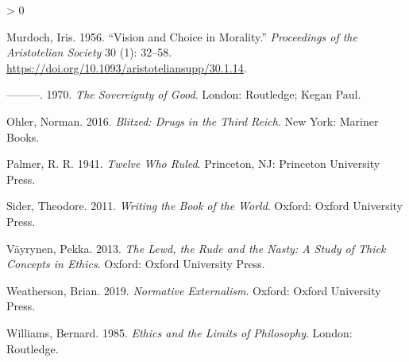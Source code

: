 \documentclass[
]{article}
\newlength{\cslhangindent}
\newenvironment{CSLReferences}[2] %
 {%
  \setlength{\parindent}{0pt}
  \ifodd #1 \everypar{\setlength{\hangindent}{\cslhangindent}}\ignorespaces\fi
  \ifnum #2 > 0
  \setlength{\parskip}{#2\baselineskip}
  \fi
 }%
 {}
\begin{document}
\begin{CSLReferences}{1}{0}
\leavevmode\hypertarget{ref-Murdoch1956}{}%
Murdoch, Iris. 1956. {``Vision and Choice in Morality.''}
\emph{Proceedings of the Aristotelian Society} 30 (1): 32--58.
\url{https://doi.org/10.1093/aristoteliansupp/30.1.14}.

\leavevmode\hypertarget{ref-Murdoch1970}{}%
---------. 1970. \emph{The Sovereignty of Good}. London: Routledge;
Kegan Paul.

\leavevmode\hypertarget{ref-Ohler2016}{}%
Ohler, Norman. 2016. \emph{Blitzed: Drugs in the Third Reich}. New York:
Mariner Books.

\leavevmode\hypertarget{ref-Palmer1941}{}%
Palmer, R. R. 1941. \emph{Twelve Who Ruled}. Princeton, NJ: Princeton
University Press.

\leavevmode\hypertarget{ref-Sider2012}{}%
Sider, Theodore. 2011. \emph{Writing the Book of the World}. Oxford:
Oxford University Press.

\leavevmode\hypertarget{ref-Vayrynen2013}{}%
Väyrynen, Pekka. 2013. \emph{The Lewd, the Rude and the Nasty: A Study
of Thick Concepts in Ethics}. Oxford: Oxford University Press.

\leavevmode\hypertarget{ref-Weatherson2019}{}%
Weatherson, Brian. 2019. \emph{Normative Externalism}. Oxford: Oxford
University Press.

\leavevmode\hypertarget{ref-Williams1985}{}%
Williams, Bernard. 1985. \emph{Ethics and the Limits of Philosophy}.
London: Routledge.

\end{CSLReferences}
\end{document}
